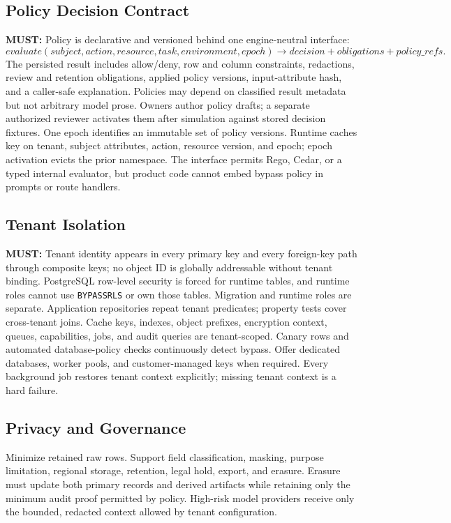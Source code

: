 \documentclass[10pt]{article}
\newcommand{\code}[1]{\texttt{#1}}
\newcommand{\must}{\textbf{\textcolor{amosblue}{MUST:}}\xspace}
\begin{document}
\subsection{Policy Decision Contract}

\must Policy is declarative and versioned behind one engine-neutral interface:
\[
evaluate(subject, action, resource, task, environment, epoch)
\rightarrow decision + obligations + policy\_refs.
\]
The persisted result includes allow/deny, row and column constraints, redactions, review and retention obligations, applied policy versions, input-attribute hash, and a caller-safe explanation. Policies may depend on classified result metadata but not arbitrary model prose. Owners author policy drafts; a separate authorized reviewer activates them after simulation against stored decision fixtures. One epoch identifies an immutable set of policy versions. Runtime caches key on tenant, subject attributes, action, resource version, and epoch; epoch activation evicts the prior namespace. The interface permits Rego, Cedar, or a typed internal evaluator, but product code cannot embed bypass policy in prompts or route handlers.

\subsection{Tenant Isolation}

\must Tenant identity appears in every primary key and every foreign-key path through composite keys; no object ID is globally addressable without tenant binding. PostgreSQL row-level security is forced for runtime tables, and runtime roles cannot use \code{BYPASSRLS} or own those tables. Migration and runtime roles are separate. Application repositories repeat tenant predicates; property tests cover cross-tenant joins. Cache keys, indexes, object prefixes, encryption context, queues, capabilities, jobs, and audit queries are tenant-scoped. Canary rows and automated database-policy checks continuously detect bypass. Offer dedicated databases, worker pools, and customer-managed keys when required. Every background job restores tenant context explicitly; missing tenant context is a hard failure.

\subsection{Privacy and Governance}

Minimize retained raw rows. Support field classification, masking, purpose limitation, regional storage, retention, legal hold, export, and erasure. Erasure must update both primary records and derived artifacts while retaining only the minimum audit proof permitted by policy. High-risk model providers receive only the bounded, redacted context allowed by tenant configuration.
\end{document}
